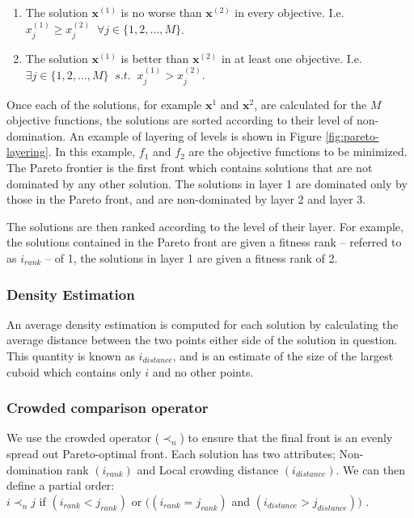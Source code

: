 \documentclass[10pt, conference, compsocconf]{IEEEtran}
\begin{document}
\begin{enumerate}
  \item The solution $\mathbf{x}^{(1)}$ is no worse than $\mathbf{x}^{(2)}$ in every objective. I.e. $x^{(1)}_j \geq x^{(2)}_j \;\;  \forall j \in\{1,2,\ldots,M\}$.
  \item The solution $\mathbf{x}^{(1)}$ is better than $\mathbf{x}^{(2)}$ in at least one objective. I.e. $\exists {j}\in \{ 1,2,\ldots,M\} \;\; s.t. \;\;x^{(1)}_j > x^{(2)}_j$.
\end{enumerate}

Once each of the solutions, for example $\mathbf{x}^1$ and $\mathbf{x}^2$, are calculated for the $M$ objective functions, the solutions are sorted according to their level of non-domination. An example of layering of levels is shown in Figure \ref{fig:pareto-layering}. In this example, $f_1$ and $f_2$ are the objective functions to be minimized. The Pareto frontier is the first front which contains solutions that are not dominated by any other solution. The solutions in layer 1 are dominated only by those in the Pareto front, and are non-dominated by layer 2 and layer 3. 

The solutions are then ranked according to the level of their layer. For example, the solutions contained in the Pareto front are given a fitness rank -- referred to as $i_{rank}$ -- of 1, the solutions in layer 1 are given a fitness rank of 2.


\subsubsection{Density Estimation}

An average density estimation is computed for each solution by calculating the average distance between the two points either side of the solution in question. This quantity is known as $i_{distance}$, and is an estimate of the size of the largest cuboid which contains only $i$ and no other points. 

\subsubsection{Crowded comparison operator}
We use the crowded operator ($\prec_n$) to ensure that the final front is an evenly spread out Pareto-optimal front. Each solution has two attributes; Non-domination rank $(i_{rank})$ and Local crowding distance $(i_{distance})$. 
We can then define a partial order:\\	
$i\prec_nj$ if $(i_{rank}<j_{rank})$ or $((i_{rank}=j_{rank})$ and $(i_{distance}>j_{distance}))$ \cite{Valkanas2014}.
\end{document}
